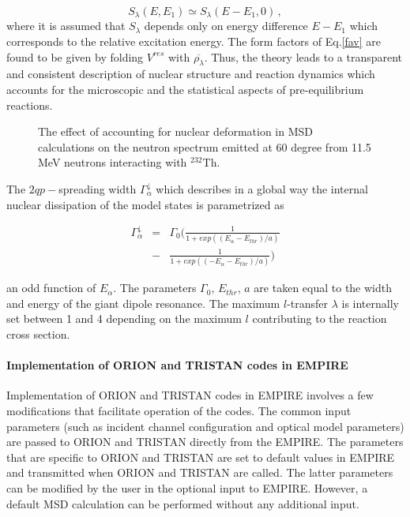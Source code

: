 \documentclass[twocolumn,amsmath,amssymb,10pt,groupedaddress,a4paper]{revtex4}
\begin{document}
\begin{equation}
S_{\lambda}(E,E_{1})\simeq S_{\lambda}(E-E_{1},0)\,,\label{slrpa}
\end{equation}
\noindent where it is assumed that $S_{\lambda}$ depends only on energy difference
$E-E_{1}$ which corresponds to the relative excitation energy. The
form factors of Eq.\ref{fav} are found to be given by folding $V^{res}$
with $\overline{\rho_{\lambda}}$. Thus, the theory leads to a transparent
and consistent description of nuclear structure and reaction dynamics
which accounts for the microscopic and the statistical aspects of
pre-equilibrium reactions.


\begin{figure}[htbp]
\caption{The effect of accounting for nuclear deformation in MSD calculations on the neutron spectrum emitted at 60 degree from 11.5 MeV neutrons interacting with $^{232}$Th.}
\label{fig:Th-defMSD}
\end{figure}


The $2qp-$spreading width $\Gamma_{\alpha}^{\downarrow}$ which describes
in a global way the internal nuclear dissipation of the model states
is parametrized as

\begin{eqnarray}
\Gamma_{\alpha}^{\downarrow}&=&\Gamma_{0}(\frac{1}{1+exp((E_{\alpha}-E_{thr})/a)} \nonumber \\ &-&\frac{1}{1+exp((-E_{\alpha}-E_{thr})/a)})
\end{eqnarray}

\noindent an odd function of $E_{\alpha}$. The parameters $\Gamma_{0},\, E_{thr},\, a$
are taken equal to the width and energy of the giant dipole resonance.
The maximum $l$-transfer $\lambda$ is internally set between 1 and
4 depending on the maximum $l$ contributing to the reaction cross
section.

\paragraph{Implementation of ORION and TRISTAN codes in EMPIRE}

Implementation of ORION and TRISTAN codes in EMPIRE
involves a few modifications that facilitate operation of the codes.
The common input parameters (such as incident channel configuration
and optical model parameters) are passed to ORION and TRISTAN directly
from the EMPIRE. The parameters that are specific to ORION and TRISTAN
are set to default values in EMPIRE and transmitted when ORION and
TRISTAN are called. The latter parameters can be modified by the user
in the optional input to EMPIRE. However, a default MSD
calculation can be performed without any additional input.
\end{document}
